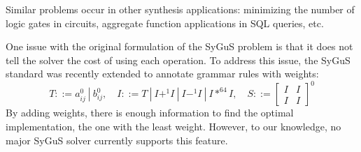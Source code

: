 Similar problems occur in other synthesis applications: minimizing the number of logic gates in circuits, aggregate function applications in SQL queries, etc.

One issue with the original formulation of the SyGuS problem is that it does not tell the solver the cost of using each operation. To address this issue, the SyGuS standard was recently extended to annotate grammar rules with weights:
%
\[
T ::= a_{ij}^0 \ | \ b_{ij}^0, \quad
I ::= T \ | \ I +^1 I \ | \ I -^1 I \ | \ I *^{64} I, \quad
S ::=
\begin{bmatrix} I & I \\
I & I
\end{bmatrix}^0
\]
%
By adding weights, there is enough information to find the optimal implementation, the one with the least weight.
%
However, to our knowledge, no major SyGuS solver currently supports this feature.
